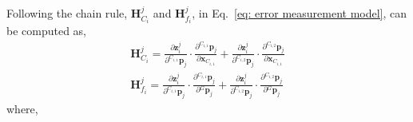 \section{}
\label{sec: measurement jacobian}
Following the chain rule, $\mathbf{H}_{C_i}^j$ and $\mathbf{H}_{f_i}^j$, in Eq.~\eqref{eq: error measurement model}, can be computed as,
\begin{equation}
\label{eq: measurement jacobian}
\begin{gathered}
\mathbf{H}_{C_i}^j = 
\frac{\partial \mathbf{z}_i^j}{\partial {}^{C_{i,1}}\mathbf{p}_j} \cdot 
\frac{\partial {}^{C_{i,1}}\mathbf{p}_j}{\partial \mathbf{x}_{C_{i,1}}} + 
\frac{\partial \mathbf{z}_i^j}{\partial {}^{C_{i,2}}\mathbf{p}_j} \cdot 
\frac{\partial {}^{C_{i,2}}\mathbf{p}_j}{\partial \mathbf{x}_{C_{i,1}}} \\
\mathbf{H}_{f_i}^j = 
\frac{\partial \mathbf{z}_i^j}{\partial {}^{C_{i,1}}\mathbf{p}_j} \cdot 
\frac{\partial {}^{C_{i,1}}\mathbf{p}_j}{\partial {}^G\mathbf{p}_j} +
\frac{\partial \mathbf{z}_i^j}{\partial {}^{C_{i,2}}\mathbf{p}_j} \cdot 
\frac{\partial {}^{C_{i,2}}\mathbf{p}_j}{\partial {}^G\mathbf{p}_j} 
\end{gathered}
\end{equation}
where,
